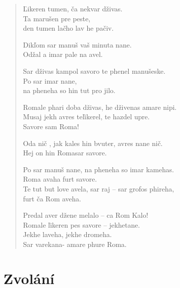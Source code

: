 \begin{verse}
Ľikeren tumen, ča nekvar dživas. \\
Ta marušen pre peste, \\
den tumen lačho lav he pačiv.

\medskip

Dikľom sar manuš  vaš minuta nane. \\
Odžal a imar pale na avel.

\medskip

Sar dživas kampol savoro te phenel manušeske. \\
Po sar imar nane,  \\
na pheneha so hin tut pro jilo.

\medskip

Romale phari doba dživas, he dživenas amare nipi. \\
Musaj jekh avres teľikerel, te hazdel upre. \\
Savore sam Roma!

\medskip

Oda nič , jak kales hin bvuter, avres nane nič. \\
Hej on hin Romasar savore.

\medskip

Po sar manuš nane, na pheneha so imar kamehas. \\
Roma avaha furt savore. \\
Te tut but love avela, sar raj – sar grofos phireha, \\
furt ča Rom aveha.

\medskip

Predal aver džene melalo -- ca Rom Kalo! \\
Romale ľikeren pes savore -- jekhetane. \\
Jekhe laveha, jekhe dromeha. \\
Sar varekana- amare phure Roma.
 \end{verse}


\section{Zvolání} 

